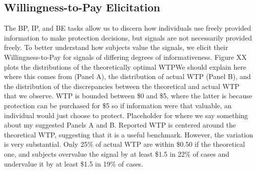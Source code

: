 \documentclass[12pt,a4paper]{article}
\newcommand{\pmt}[1]{{\color{Blue}#1}}
\begin{document}
\begin{figure}[H]
	\hfill
	\hfill
\end{figure}
\clearpage


\subsection{Willingness-to-Pay Elicitation}
The BP, IP, and BE tasks allow us to discern how individuals use freely provided information to make protection decisions, but signals are not necessarily provided freely.  To better understand how subjects value the signals, we elicit their Willingness-to-Pay for signals of differing degrees of informativeness.  Figure XX plots the distributions of the theoretically optimal WTP\pmt{We should explain here where this comes from} (Panel A), the distribution of actual WTP (Panel B), and the distribution of the discrepancies between the theoretical and actual WTP that we observe.  WTP is bounded between \$0 and \$5, where the latter is because protection can be purchased for \$5 so if information were that valuable, an individual would just choose to protect.  \pmt{Placeholder for where we say something about my suggested Panels A and B.}  Reported WTP is centered around the theoretical WTP, suggesting that it is a useful benchmark. However, the variation is very substantial. Only 25\% of actual WTP are within \$0.50 if the theoretical one, and subjects overvalue the signal by at least \$1.5 in 22\% of cases and undervalue it  by at least \$1.5 in 19\% of cases. 
\end{document}
